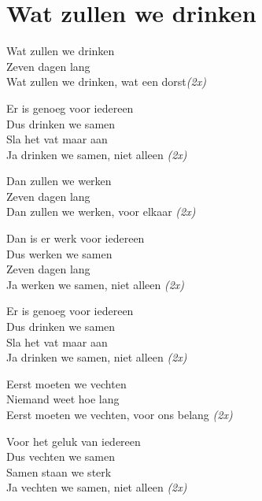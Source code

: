 \section{Wat zullen we drinken}
Wat zullen we drinken \\
Zeven dagen lang \\
Wat zullen we drinken, wat een dorst\textit{(2x)}

Er is genoeg voor iedereen \\
Dus drinken we samen \\
Sla het vat maar aan \\
Ja drinken we samen, niet alleen \textit{(2x)}

Dan zullen we werken \\
Zeven dagen lang \\
Dan zullen we werken, voor elkaar \textit{(2x)}

Dan is er werk voor iedereen \\
Dus werken we samen \\
Zeven dagen lang \\
Ja werken we samen, niet alleen \textit{(2x)}

Er is genoeg voor iedereen \\
Dus drinken we samen \\
Sla het vat maar aan \\
Ja drinken we samen, niet alleen \textit{(2x)}

Eerst moeten we vechten \\
Niemand weet hoe lang \\
Eerst moeten we vechten, voor ons belang \textit{(2x)}

Voor het geluk van iedereen \\
Dus vechten we samen \\
Samen staan we sterk \\
Ja vechten we samen, niet alleen \textit{(2x)}